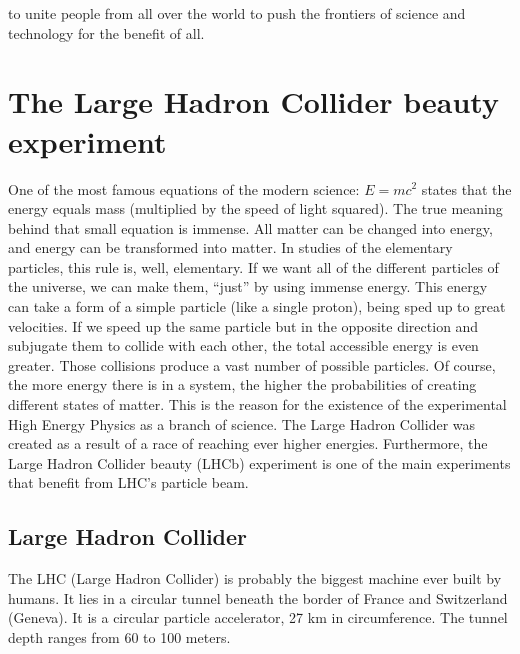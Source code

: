 \begin{savequote}[75mm]
[..] to unite people from all over the world to push the frontiers of science and technology for the benefit of all.
\end{savequote}

\chapter{The Large Hadron Collider beauty experiment}

One of the most famous equations of the modern science: $E = mc^{2}$ states that the energy equals mass (multiplied by the speed of light squared).
The true meaning behind that small equation is immense.
All matter can be changed into energy, and energy can be transformed into matter.
In studies of the elementary particles, this rule is, well, elementary.
If we want all of the different particles of the universe, we can make them, ``just'' by using immense energy.
This energy can take a form of a simple particle (like a single proton), being sped up to great velocities.
If we speed up the same particle but in the opposite direction and subjugate them to collide with each other, the total accessible energy is even greater.
Those collisions produce a vast number of possible particles.
Of course, the more energy there is in a system, the higher the probabilities of creating different states of matter.
This is the reason for the existence of the experimental High Energy Physics as a branch of science.
The Large Hadron Collider was created as a result of a race of reaching ever higher energies.
Furthermore, the Large Hadron Collider beauty \cite{Collaboration_2008} (LHCb) experiment is one of the main experiments that benefit from LHC's particle beam.

\section{Large Hadron Collider}

The LHC (Large Hadron Collider) is probably the biggest machine ever built by humans.
It lies in a circular tunnel beneath the border of France and Switzerland (Geneva).
It is a circular particle accelerator, 27 km in circumference.
The tunnel depth ranges from 60 to 100 meters.

